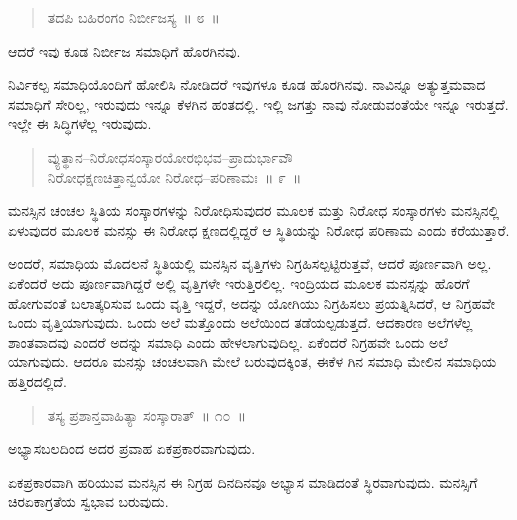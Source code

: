 \vspace{-0.3cm}

\begin{verse}
ತದಪಿ ಬಹಿರಂಗಂ ನಿರ್ಬೀಜಸ್ಯ~॥ ೮~॥
\end{verse}

\vspace{-0.3cm}

ಆದರೆ ಇವು ಕೂಡ ನಿರ್ಬೀಜ ಸಮಾಧಿಗೆ ಹೊರಗಿನವು. 

ನಿರ್ವಿಕಲ್ಪ ಸಮಾಧಿಯೊಂದಿಗೆ ಹೋಲಿಸಿ ನೋಡಿದರೆ ಇವುಗಳೂ ಕೂಡ ಹೊರಗಿನವು. ನಾವಿನ್ನೂ ಅತ್ಯುತ್ತಮವಾದ ಸಮಾಧಿಗೆ ಸೇರಿಲ್ಲ, ಇರುವುದು ಇನ್ನೂ ಕೆಳಗಿನ ಹಂತದಲ್ಲಿ. ಇಲ್ಲಿ ಜಗತ್ತು ನಾವು ನೋಡುವಂತೆಯೇ ಇನ್ನೂ ಇರುತ್ತದೆ. ಇಲ್ಲೇ ಈ ಸಿದ್ಧಿಗಳೆಲ್ಲ ಇರುವುದು. 

\vspace{-0.3cm}

\begin{verse}
ವ್ಯುತ್ಥಾನ–ನಿರೋಧಸಂಸ್ಕಾರಯೋರಭಿಭವ–ಪ್ರಾದುರ್ಭಾವೌ\\ನಿರೋಧಕ್ಷಣಚಿತ್ತಾನ್ವಯೋ ನಿರೋಧ–ಪರಿಣಾಮಃ~॥ ೯~॥
\end{verse}

\vspace{-0.3cm}

ಮನಸ್ಸಿನ ಚಂಚಲ ಸ್ಥಿತಿಯ ಸಂಸ್ಕಾರಗಳನ್ನು ನಿರೋಧಿಸುವುದರ ಮೂಲಕ ಮತ್ತು ನಿರೋಧ ಸಂಸ್ಕಾರಗಳು ಮನಸ್ಸಿನಲ್ಲಿ ಏಳುವುದರ ಮೂಲಕ ಮನಸ್ಸು ಈ ನಿರೋಧ ಕ್ಷಣದಲ್ಲಿದ್ದರೆ ಆ ಸ್ಥಿತಿಯನ್ನು ನಿರೋಧ ಪರಿಣಾಮ ಎಂದು ಕರೆಯುತ್ತಾರೆ. 

ಅಂದರೆ, ಸಮಾಧಿಯ ಮೊದಲನೆ ಸ್ಥಿತಿಯಲ್ಲಿ ಮನಸ್ಸಿನ ವೃತ್ತಿಗಳು ನಿಗ್ರಹಿಸಲ್ಪಟ್ಟಿರುತ್ತವೆ, ಆದರೆ ಪೂರ್ಣವಾಗಿ ಅಲ್ಲ. ಏಕೆಂದರೆ ಅದು ಪೂರ್ಣವಾಗಿದ್ದರೆ ಅಲ್ಲಿ ವೃತ್ತಿಗಳೇ ಇರುತ್ತಿರಲಿಲ್ಲ. ಇಂದ್ರಿಯದ ಮೂಲಕ ಮನಸ್ಸನ್ನು ಹೊರಗೆ ಹೋಗುವಂತೆ ಬಲಾತ್ಕರಿಸುವ ಒಂದು ವೃತ್ತಿ ಇದ್ದರೆ, ಅದನ್ನು ಯೋಗಿಯು ನಿಗ್ರಹಿಸಲು ಪ್ರಯತ್ನಿಸಿದರೆ, ಆ ನಿಗ್ರಹವೇ ಒಂದು ವೃತ್ತಿಯಾಗುವುದು. ಒಂದು ಅಲೆ ಮತ್ತೊಂದು ಅಲೆಯಿಂದ ತಡೆಯಲ್ಪಡುತ್ತದೆ. ಆದಕಾರಣ ಅಲೆಗಳೆಲ್ಲ ಶಾಂತವಾದವು ಎಂದರೆ ಅದನ್ನು ಸಮಾಧಿ ಎಂದು ಹೇಳಲಾಗುವುದಿಲ್ಲ. ಏಕೆಂದರೆ ನಿಗ್ರಹವೇ ಒಂದು ಅಲೆ ಯಾಗುವುದು. ಆದರೂ ಮನಸ್ಸು ಚಂಚಲವಾಗಿ ಮೇಲೆ ಬರುವುದಕ್ಕಿಂತ, ಈಕೆಳ ಗಿನ ಸಮಾಧಿ ಮೇಲಿನ ಸಮಾಧಿಯ ಹತ್ತಿರದಲ್ಲಿದೆ. 

\vspace{-0.3cm}

\begin{verse}
ತಸ್ಯ ಪ್ರಶಾನ್ತವಾಹಿತ್ಯಾ ಸಂಸ್ಕಾರಾತ್​~॥ ೧೦~॥
\end{verse}

\vspace{-0.3cm}

ಅಭ್ಯಾಸಬಲದಿಂದ ಅದರ ಪ್ರವಾಹ ಏಕಪ್ರಕಾರವಾಗುವುದು. 

ಏಕಪ್ರಕಾರವಾಗಿ ಹರಿಯುವ ಮನಸ್ಸಿನ ಈ ನಿಗ್ರಹ ದಿನದಿನವೂ ಅಭ್ಯಾಸ ಮಾಡಿದಂತೆ ಸ್ಥಿರವಾಗುವುದು. ಮನಸ್ಸಿಗೆ ಚಿರಏಕಾಗ್ರತೆಯ ಸ್ವಭಾವ ಬರುವುದು. 

\vspace{-0.3cm}

